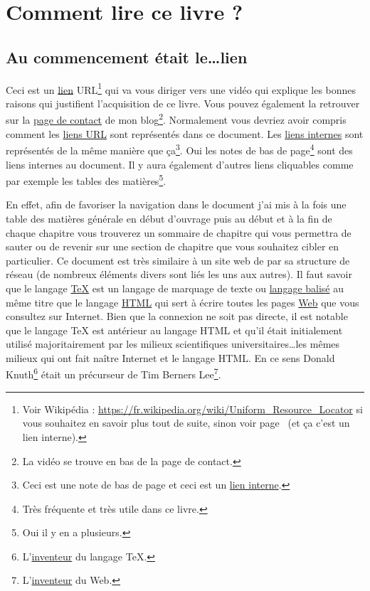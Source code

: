 \chapter{Comment lire ce livre ?}\label{chap:howto}
\newpage
\minitoc
\newpage

\section{Au commencement était le\dots lien}\label{sec:link}

Ceci est un \href{https://youtu.be/K88qlGcd7Ek}{lien}
\hypertarget{url}{URL}\footnote{Voir Wikipédia :
  \url{https://fr.wikipedia.org/wiki/Uniform_Resource_Locator} si vous
  souhaitez en savoir plus tout de suite, sinon voir
  page~\pageref{sec:side} (et ça c'est un lien interne).} qui va vous diriger vers une vidéo qui
explique les bonnes raisons qui justifient l'acquisition de ce
livre. Vous pouvez également la retrouver sur la \href{http://doyouspeakenglish.fr/contact/}{page de contact} de mon
blog\footnote{La vidéo se trouve en bas de la page de contact.}. Normalement vous
devriez avoir compris comment les
\href{https://fr.wikipedia.org/wiki/Uniform_Resource_Locator}{liens
  URL} sont représentés dans ce document. Les \hyperlink{linkin}{liens internes} \hypertarget{retour}{sont}\label{retour}
représentés de la même manière que ça\footnote{Ceci est une note de
  bas de page et ceci est un \hyperlink{linkin}{lien interne}.}. Oui les notes de bas de page\footnote{Très fréquente
  et très utile dans ce livre.} sont des liens internes au
document. Il y aura également d'autres liens cliquables comme par
exemple les tables des matières\footnote{Oui il y en a plusieurs.}.

En effet, afin de favoriser la navigation dans le document j'ai mis à la
fois une table des matières générale en début d'ouvrage puis au début
et à la fin de chaque chapitre vous trouverez un sommaire de chapitre
qui vous permettra de sauter ou de revenir sur une section de
chapitre que vous souhaitez cibler en particulier. Ce document est
très similaire à un site web de par sa structure de réseau (de
nombreux éléments divers sont liés les uns aux autres). Il faut savoir
que le langage \href{https://fr.wikipedia.org/wiki/TeX}{\TeX} est un langage de
marquage de texte ou \underline{langage balisé} au même titre que le
langage \href{https://fr.wikipedia.org/wiki/Langage_de_balisage\#Langage_HTML}{HTML}
qui sert à écrire toutes les pages  \href{https://fr.wikipedia.org/wiki/World_Wide_Web}{Web}
que vous consultez sur Internet. Bien que la connexion ne soit pas
directe, il est notable que le langage \TeX{} est antérieur au langage
HTML et qu'il était initialement utilisé majoritairement par les
milieux scientifiques universitaires\dots les mêmes milieux qui ont
fait naître Internet et le langage HTML. En ce sens Donald
Knuth\footnote{L'\href{https://fr.wikipedia.org/wiki/Donald_Knuth}{inventeur} du langage \TeX{}.} était un précurseur de
Tim Berners Lee\footnote{L'\href{https://fr.wikipedia.org/wiki/Tim_Berners-Lee}{inventeur} du Web.}.

